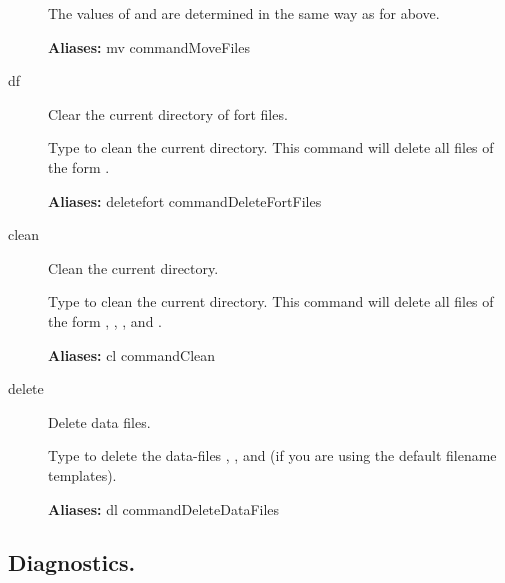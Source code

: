 \documentclass[12pt]{report}
\begin{document}
\begin{description}
    The values of  and  are determined
    in the same way as for  above.

\textbf{Aliases:} mv commandMoveFiles

\item[df]
Clear the current directory of fort files.

    Type  to clean the current directory.  This command will
    delete all files of the form .
    
\textbf{Aliases:} deletefort commandDeleteFortFiles

\item[clean]
Clean the current directory.

    Type  to clean the current directory.  This command will
    delete all files of the form , ,
    , and .
    
\textbf{Aliases:}
cl commandClean

\item[delete]
Delete data files.

    Type  to delete the data-files ,
    , and  (if you are using the default
    filename templates).
    
\textbf{Aliases:} dl commandDeleteDataFiles
\end{description}

\subsection{Diagnostics.} \label{sec:clui_ref_diagnostics}
\end{document}
